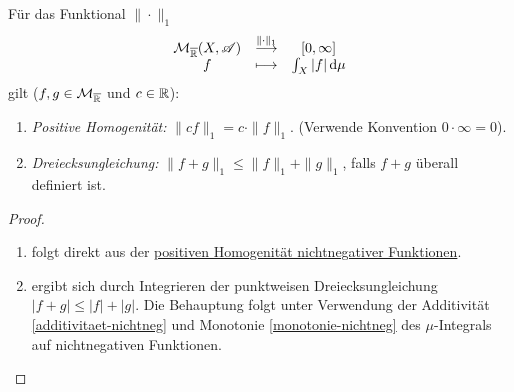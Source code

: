 \begin{lemma}
\begin{mdframed}
Für das Funktional $\|\cdot\|_1$
\begin{equation*}
\begin{array}{ccc}
\mathcal{M}_{\overline{\mathbb{R}}}(X,\mathscr{A}) & \overset{\|\cdot\|_1}\longrightarrow & [0,\infty]\\
f & \longmapsto &  \int_X|f|\, \mathrm{d}\mu
\end{array}
\end{equation*}
gilt ($f,g \in \mathcal{M}_{\overline{\mathbb{R}}}$ und $c\in\mathbb{R}$):
\begin{enumerate}
\item \emph{Positive Homogenität:} $\|cf\|_1 = c\cdot \|f\|_1$. (Verwende Konvention $0\cdot \infty=0$).
\item \emph{Dreiecksungleichung:} $\|f +g\|_1 \leq \|f\|_1 +\|g\|_1$, falls $f+g$ überall definiert ist.
\end{enumerate}
\end{mdframed}
\begin{proof}
\begin{enumerate}
\item folgt direkt aus der \hyperref[homogen-nicht-neg]{positiven Homogenität nichtnegativer Funktionen}.
\item 
ergibt sich durch Integrieren der punktweisen Dreiecksungleichung $|f+g|\leq |f|+|g|$. Die Behauptung folgt unter Verwendung der Additivität \eqref{additivitaet-nichtneg} und Monotonie \eqref{monotonie-nichtneg} des $\mu$-Integrals auf nichtnegativen Funktionen.

\end{enumerate}
\end{proof}
\end{lemma}
